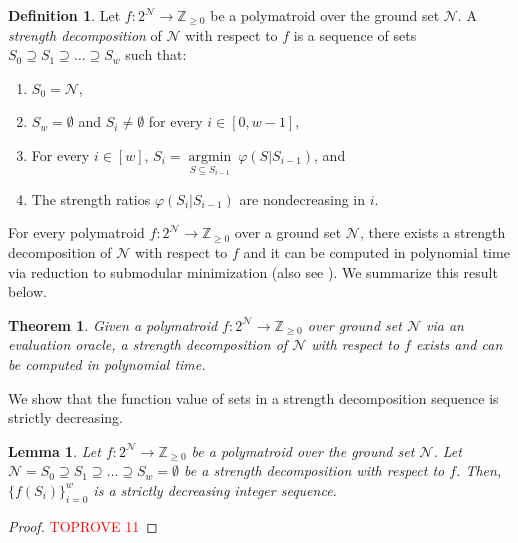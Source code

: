 \documentclass[11pt]{article}
\newtheorem{theorem}{Theorem}
\newtheorem{lemma}{Lemma}
\theoremstyle{definition}
\newtheorem{definition}{Definition}
\newcommand{\calN}{{\mathcal{N}}}
\begin{document}
\begin{definition}\cite{quanrud2024quotient} 
Let $f:2^\mathcal{N}\rightarrow \mathbb{Z}_{\geq 0}$ be a polymatroid over the ground set $\mathcal{N}$. 
    A \emph{strength decomposition} of $\mathcal{N}$ with respect to $f$ is a sequence of sets $S_0\supseteq S_1 \supseteq \ldots \supseteq S_w$ such that:
    \begin{enumerate}[label=(\arabic*)]
        \item $S_0=\mathcal{N}$,
        \item $S_w=\emptyset$ and $S_i\neq \emptyset$ for every $i\in [0,w-1]$,
        \item For every $i\in [w]$, $S_i=\mathop{argmin}\limits_{S\subseteq S_{i-1}} \ \varphi(S|S_{i-1})$, and
        \item The strength ratios $\varphi(S_i|S_{i-1})$ are nondecreasing in $i$.
    \end{enumerate}
\end{definition}

For every polymatroid $f:2^{\mathcal{N}}\rightarrow \mathbb{Z}_{\geq 0}$ over a ground set $\calN$, there exists a strength decomposition of $\calN$ with respect to $f$ and it can be computed in polynomial time via reduction to submodular minimization \cite{Nar91, Narayanan-book, Fuj09} (also see \cite{quanrud2024quotient}). We summarize this result below. 


\begin{theorem}\label{theorem:strength-decomposition}
    Given a polymatroid $f:2^{\mathcal{N}}\rightarrow \mathbb{Z}_{\geq 0}$ over ground set $\mathcal{N}$ via an evaluation oracle, a strength decomposition of $\mathcal{N}$ with respect to $f$ exists and can be computed in polynomial time.
\end{theorem}

We show that the function value of sets in a strength decomposition sequence is strictly decreasing.

\begin{lemma}\label{lemma:decomposition-value}
    Let $f:2^\mathcal{N}\rightarrow \mathbb{Z}_{\geq 0}$ be a polymatroid over the ground set $\mathcal{N}$. Let $\calN=S_0\supseteq S_1\supseteq \ldots \supseteq S_w=\emptyset$ be a strength decomposition with respect to $f$. Then, $\{f(S_i)\}_{i=0}^{w}$ is a strictly decreasing integer sequence.
\end{lemma}
\begin{proof}\textcolor{red}{TOPROVE 11}\end{proof}
\end{document}
